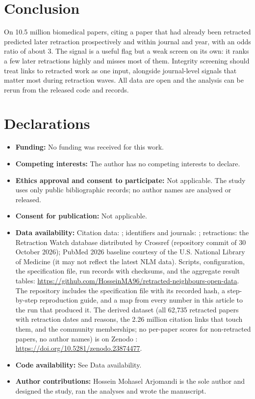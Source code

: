 \documentclass[pdflatex,sn-basic]{sn-jnl}
\begin{document}
\section{Conclusion}\label{sec:conclusion}
On 10.5 million biomedical papers, citing a paper that had already been retracted predicted later retraction
prospectively and within journal and year, with an odds ratio of about 3. The signal is a useful flag but a weak
screen on its own: it ranks a few later retractions highly and misses most of them. Integrity screening should treat
links to retracted work as one input, alongside journal-level signals that matter most during retraction waves. All
data are open and the analysis can be rerun from the released code and records.

\backmatter

\section*{Declarations}\label{sec:availability}

\begin{itemize}
\item \textbf{Funding:} No funding was received for this work.
\item \textbf{Competing interests:} The author has no competing interests to declare.
\item \textbf{Ethics approval and consent to participate:} Not applicable. The study uses only public bibliographic
records; no author names are analysed or released.
\item \textbf{Consent for publication:} Not applicable.
\item \textbf{Data availability:} %
Citation data: \citet{arjomandi2024dataset}; identifiers and journals: \citet{ocmeta2024dump}; retractions: the
Retraction Watch database distributed by Crossref (repository commit of 30 October 2026); PubMed 2026 baseline courtesy
of the U.S. National Library of Medicine (it may not reflect the latest NLM data). Scripts, configuration, the
specification file, run records with checksums, and the aggregate result tables:
\url{https://github.com/HosseinMA96/retracted-neighbours-open-data}. The repository includes the specification file
with its recorded hash, a step-by-step reproduction guide, and a map from every number in this article to the run that
produced it. The derived dataset (all 62,735 retracted papers with retraction dates and reasons, the 2.26 million citation
links that touch them, and the community memberships; no per-paper scores for non-retracted papers, no author names) is
on Zenodo \citep{arjomandi2026retracteddata}: \url{https://doi.org/10.5281/zenodo.23874477}.
\item \textbf{Code availability:} See Data availability.
\item \textbf{Author contributions:} Hossein Mohasel Arjomandi is the sole author and designed the study, ran the analyses and wrote the manuscript.
\end{itemize}


\end{document}
